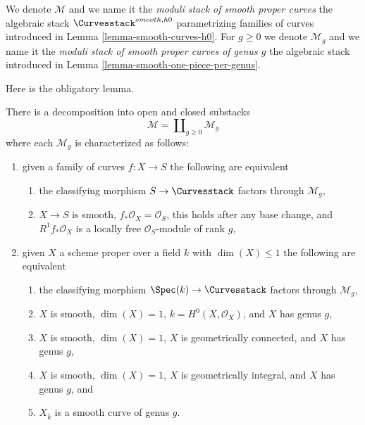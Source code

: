 \begin{definition}
\label{definition-deligne-mumford-smooth}
\begin{reference}
\cite{DM}
\end{reference}
We denote $\mathcal{M}$ and we name it the
{\it moduli stack of smooth proper curves}
the algebraic stack
$\Curvesstack^{smooth, h0}$ parametrizing families of curves
introduced in Lemma \ref{lemma-smooth-curves-h0}.
For $g \geq 0$ we denote $\mathcal{M}_g$ and we name it the
{\it moduli stack of smooth proper curves of genus $g$}
the algebraic stack introduced in
Lemma \ref{lemma-smooth-one-piece-per-genus}.
\end{definition}

\noindent
Here is the obligatory lemma.

\begin{lemma}
\label{lemma-smooth-one-piece-per-genus}
There is a decomposition into open and closed substacks
$$
\mathcal{M} = \coprod\nolimits_{g \geq 0} \mathcal{M}_g
$$
where each $\mathcal{M}_g$ is characterized as follows:
\begin{enumerate}
\item given a family of curves $f : X \to S$ the following are equivalent
\begin{enumerate}
\item the classifying morphism $S \to \Curvesstack$ factors
through $\mathcal{M}_g$,
\item $X \to S$ is smooth, $f_*\mathcal{O}_X = \mathcal{O}_S$,
this holds after any base change, and $R^1f_*\mathcal{O}_X$
is a locally free $\mathcal{O}_S$-module of rank $g$,
\end{enumerate}
\item given $X$ a scheme proper over a field $k$ with
$\dim(X) \leq 1$ the following are equivalent
\begin{enumerate}
\item the classifying morphism $\Spec(k) \to \Curvesstack$
factors through $\mathcal{M}_g$,
\item $X$ is smooth, $\dim(X) = 1$, $k = H^0(X, \mathcal{O}_X)$,
and $X$ has genus $g$,
\item $X$ is smooth, $\dim(X) = 1$, $X$ is geometrically connected, and
$X$ has genus $g$,
\item $X$ is smooth, $\dim(X) = 1$, $X$ is geometrically integral, and
$X$ has genus $g$, and
\item $X_{\overline{k}}$ is a smooth curve of genus $g$.
\end{enumerate}
\end{enumerate}
\end{lemma}

